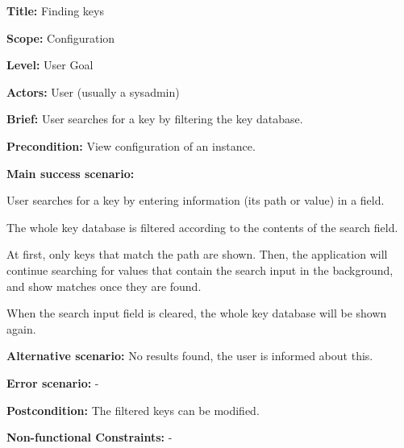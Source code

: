 
\begin{DoxyItemize}
\item {\bfseries Title\+:} Finding keys
\item {\bfseries Scope\+:} Configuration
\item {\bfseries Level\+:} User Goal
\item {\bfseries Actors\+:} User (usually a sysadmin)
\item {\bfseries Brief\+:} User searches for a key by filtering the key database.
\end{DoxyItemize}


\begin{DoxyItemize}
\item {\bfseries Precondition\+:} View configuration of an instance.
\item {\bfseries Main success scenario\+:}
\begin{DoxyItemize}
\item User searches for a key by entering information (its path or value) in a field.
\item The whole key database is filtered according to the contents of the search field.
\item At first, only keys that match the path are shown. Then, the application will continue searching for values that contain the search input in the background, and show matches once they are found.
\item When the search input field is cleared, the whole key database will be shown again.
\end{DoxyItemize}
\item {\bfseries Alternative scenario\+:} No results found, the user is informed about this.
\item {\bfseries Error scenario\+:} -\/
\item {\bfseries Postcondition\+:} The filtered keys can be modified.
\item {\bfseries Non-\/functional Constraints\+:} -\/ 
\end{DoxyItemize}